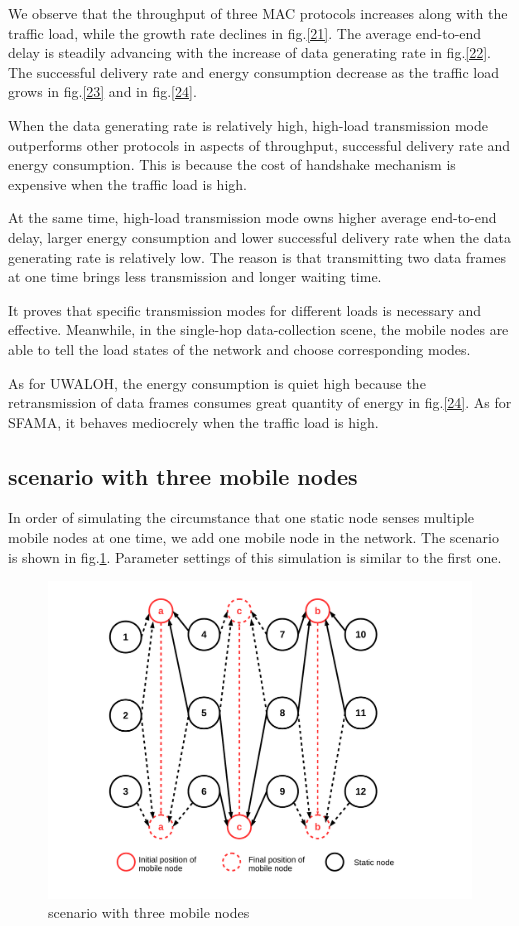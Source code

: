 \documentclass[conference]{IEEEtran}
\begin{document}
We observe that the throughput of three MAC protocols increases along with the traffic load, while the growth rate declines in fig.\ref{21}. The average end-to-end delay is steadily advancing with the increase of data generating rate in fig.\ref{22}. The successful delivery rate and energy consumption decrease as the traffic load grows in fig.\ref{23} and in fig.\ref{24}.

When the data generating rate is relatively high, high-load transmission mode outperforms other protocols in aspects of throughput, successful delivery rate and energy consumption. This is because the cost of handshake mechanism is expensive when the traffic load is high.

At the same time, high-load transmission mode owns higher average end-to-end delay, larger energy consumption and lower successful delivery rate when the data generating rate is relatively low. The reason is that transmitting two data frames at one time brings less transmission and longer waiting time.

It proves that specific transmission modes for different loads is necessary and effective. Meanwhile, in the single-hop data-collection scene, the mobile nodes are able to tell the load states of the network and choose corresponding modes.

As for UWALOH, the energy consumption is quiet high because the retransmission of data frames consumes great quantity of energy in fig.\ref{24}. As for SFAMA, it behaves mediocrely when the traffic load is high.


\subsection{scenario with three mobile nodes}
In order of simulating the circumstance that one static node senses multiple mobile nodes at one time, we add one mobile node in the network. The scenario is shown in fig.\ref{3scen}. Parameter settings of this simulation is similar to the first one. 

 \begin{figure}[!h]
 	\centering
 	\includegraphics[scale=0.25]{figures/3scen.pdf}
 	\caption{
 		scenario with three mobile nodes
 	}
 	\label{3scen}
 \end{figure}
\end{document}
